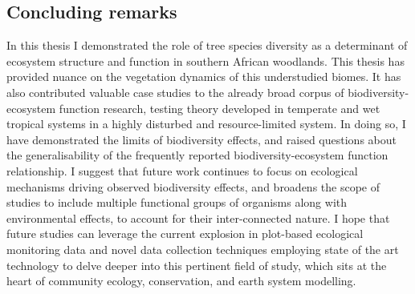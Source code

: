 \begin{refsection}
\section{Concluding remarks}
\label{discussion:sec:conclusion}

In this thesis I demonstrated the role of tree species diversity as a determinant of ecosystem structure and function in southern African woodlands. This thesis has provided nuance on the vegetation dynamics of this understudied biomes. It has also contributed valuable case studies to the already broad corpus of biodiversity-ecosystem function research, testing theory developed in temperate and wet tropical systems in a highly disturbed and resource-limited system. In doing so, I have demonstrated the limits of biodiversity effects, and raised questions about the generalisability of the frequently reported biodiversity-ecosystem function relationship. I suggest that future work continues to focus on ecological mechanisms driving observed biodiversity effects, and broadens the scope of studies to include multiple functional groups of organisms along with environmental effects, to account for their inter-connected nature. I hope that future studies can leverage the current explosion in plot-based ecological monitoring data and novel data collection techniques employing state of the art technology to delve deeper into this pertinent field of study, which sits at the heart of community ecology, conservation, and earth system modelling.

\newpage{}
\begingroup
{}
\printbibliography[heading=subbibintoc]
\endgroup

\end{refsection}

